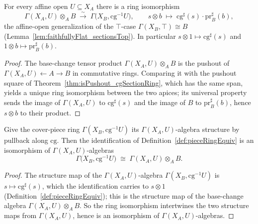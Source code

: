 \begin{definition}
  \label{def:pieceRingEquiv}
  \leanok
  For every affine open \(U \subseteq X_A\) there is a ring isomorphism
  \[
    \Gamma(X_A, U) \otimes_A B \;\xrightarrow{\ \sim\ }\; \Gamma\bigl(X_B, \mathrm{cg}^{-1}U\bigr),
    \qquad s \otimes b \;\longmapsto\; \mathrm{cg}^{\sharp}(s)\cdot \mathrm{pr}_B^{\sharp}(b),
  \]
  the affine-open generalization of the \(\top\)-case \(\Gamma(X_B, \top) \cong B\)
  (Lemma~\ref{lem:faithfullyFlat_sectionsTop}). In particular \(s \otimes 1 \mapsto
  \mathrm{cg}^{\sharp}(s)\) and \(1 \otimes b \mapsto \mathrm{pr}_B^{\sharp}(b)\).
\end{definition}
\begin{proof}
  \leanok
  The base-change tensor product \(\Gamma(X_A, U) \otimes_A B\) is the pushout of \(\Gamma(X_A, U)
  \leftarrow A \to B\) in commutative rings. Comparing it with the pushout square of
  Theorem~\ref{thm:isPushout_cgSectionRing}, which has the same span, yields a unique ring
  isomorphism between the two apices; its universal property sends the image of \(\Gamma(X_A, U)\)
  to \(\mathrm{cg}^{\sharp}(s)\) and the image of \(B\) to \(\mathrm{pr}_B^{\sharp}(b)\), hence
  \(s \otimes b\) to their product.
\end{proof}

\begin{definition}
  \label{def:pieceAlgEquiv}
  \leanok
  Give the cover-piece ring \(\Gamma(X_B, \mathrm{cg}^{-1}U)\) its \(\Gamma(X_A,
  U)\)-algebra structure by pullback along \(\mathrm{cg}\). Then the identification of
  Definition~\ref{def:pieceRingEquiv} is an isomorphism of \(\Gamma(X_A, U)\)-algebras
  \[
    \Gamma\bigl(X_B, \mathrm{cg}^{-1}U\bigr) \;\cong\; \Gamma(X_A, U) \otimes_A B .
  \]
\end{definition}
\begin{proof}
  \leanok
  The structure map of the \(\Gamma(X_A, U)\)-algebra \(\Gamma(X_B, \mathrm{cg}^{-1}U)\) is
  \(s \mapsto \mathrm{cg}^{\sharp}(s)\), which the identification carries to \(s \otimes 1\)
  (Definition~\ref{def:pieceRingEquiv}); this is the structure map of the base-change algebra
  \(\Gamma(X_A, U) \otimes_A B\). So the ring isomorphism intertwines the two structure maps from
  \(\Gamma(X_A, U)\), hence is an isomorphism of \(\Gamma(X_A, U)\)-algebras.
\end{proof}

